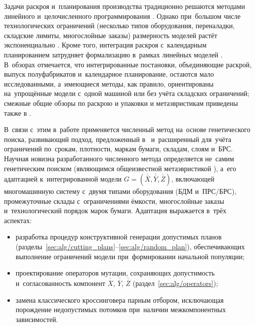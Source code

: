 Задачи раскроя и~планирования производства традиционно решаются методами линейного и~целочисленного программирования \cite{haessler1991,martina2022}.
Однако при~большом числе технологических ограничений (несколько типов оборудования, переналадки, складские лимиты, многослойные заказы) размерность моделей растёт экспоненциально \cite{sgp_ccp2021_cutting_stock_modes,mobasher2013,vanderbeck2000}.
Кроме того, интеграция раскроя с~календарным планированием затрудняет формализацию в~рамках линейных моделей \cite{gao_energy_2019,keskinocak2002}.
В~обзорах \cite{melega2018review,yanasse2007integrated} отмечается, что интегрированные постановки, объединяющие раскрой, выпуск полуфабрикатов и~календарное планирование, остаются мало исследованными, а~имеющиеся методы, как правило, ориентированы на~упрощённые модели с~одной машиной или без учёта складских ограничений; смежные общие обзоры по раскрою и упаковки и метаэвристикам приведены также в \cite{scheithauer2017_cutpack_optimization, gendreau2019_handbook_metaheur}.
 
 В~связи с~этим в~работе применяется численный метод на~основе генетического поиска, развивающий подход, предложенный в~\cite{klimenko2024_prin,klimenko2025ivdon,klimenko2025fruct} и~расширенный для~учёта ограничений по~срокам, плотности, маркам бумаги, складам, слоям и~БРС.
 Научная новизна разработанного численного метода определяется не~самим генетическим поиском (являющимся общеизвестной метаэвристикой \cite{goldberg1989genetic, holland1992_adaptation, eiben2015_intro_ec}), а~его адаптацией к~интегрированной модели $G=(\overline{\overline{X}},\overline{\overline{Y}},\overline{\overline{Z}})$, включающей многомашинную систему с~двумя типами оборудования (БДМ и~ПРС/БРС), промежуточные склады с~ограничениями ёмкости, многослойные заказы и~технологический порядок марок бумаги.
Адаптация выражается в~трёх аспектах:
\begin{itemize}
  \item разработка процедур конструктивной генерации допустимых планов (разделы~\ref{sec:alg/cutting_plans}--\ref{sec:alg/random_plan}), обеспечивающих выполнение ограничений модели при~формировании начальной популяции;
  \item проектирование операторов мутации, сохраняющих допустимость и~согласованность компонент $\overline{\overline{X}}$, $\overline{\overline{Y}}$, $\overline{\overline{Z}}$ (раздел~\ref{sec:alg/operators});
  \item замена классического кроссинговера парным отбором, исключающая порождение недопустимых потомков при~наличии межкомпонентных зависимостей.
\end{itemize}


